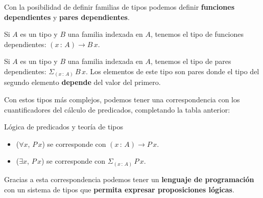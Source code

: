 \documentclass[xcolor=dvipsnames]{beamer} %
\newcommand{\tjud}[2]
  {\ensuremath{#1\,:\,#2}}
\newcommand{\depPair}[3]
 {\ensuremath{\Sigma_{(\tjud{#1}{#2})}\,#3\,#1}
 }
\begin{document}
\begin{frame}
 \begin{block}{}
  Con la posibilidad de definir familias de tipos podemos definir \textbf{funciones dependientes} y \textbf{pares dependientes}.
 \end{block}
 
 \pause
 
 \begin{block}{}
  Si $A$ es un tipo y $B$ una familia indexada en $A$, tenemos el tipo de funciones dependientes:
  $(\tjud{x}{A}) \rightarrow B\,x$.
 \end{block}
 
 \pause
 
 \begin{block}{}
  Si $A$ es un tipo y $B$ una familia indexada en $A$, tenemos el tipo de pares dependientes:
  $\depPair{x}{A}{B}$. Los elementos de este tipo son pares donde el tipo del segundo elemento \textbf{depende}
  del valor del primero.
 \end{block} 

 \pause
 
\end{frame}


\begin{frame}
 
   \begin{block}{}
  Con estos tipos más complejos, podemos tener una correspondencia con los cuantificadores del cálculo
  de predicados, completando la tabla anterior:
 \end{block}

 \pause

  \begin{block}{Lógica de predicados y teoría de tipos}
   \begin{itemize}
    \item ($\forall x$, $P\,x$) se corresponde con $(\tjud{x}{A}) \rightarrow P\,x$.
    \item ($\exists x$, $P\,x$) se corresponde con $\depPair{x}{A}{P}$.
    \end{itemize}
  \end{block}

  \pause
  
  \begin{block}{}
   Gracias a esta correspondencia podemos tener un \textbf{lenguaje de programación} con un sistema
   de tipos que \textbf{permita expresar proposiciones lógicas}.
  \end{block}

\end{frame}
\end{document}
